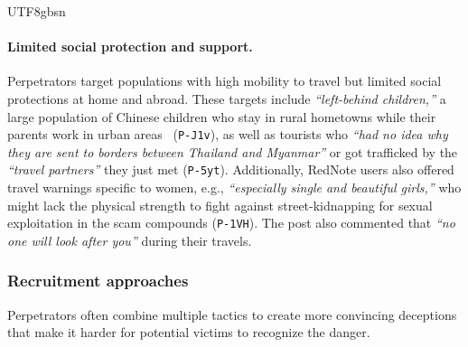 \documentclass[sigconf,nonacm]{acmart}
\begin{document}
\begin{CJK}{UTF8}{gbsn}
\paragraph{\textbf{Limited social protection and support.}} Perpetrators target populations with high mobility to travel but limited social protections at home and abroad. These targets include \textit{``left-behind children,''} a large population of Chinese children who stay in rural hometowns while their parents work in urban areas~\cite{jingzhong2011left} (\texttt{P-J1v}), as well as tourists who \textit{``had no idea why they are sent to borders between Thailand and Myanmar''} or got trafficked by the \textit{``travel partners''} they just met (\texttt{P-5yt}). Additionally, RedNote users also offered travel warnings specific to women, e.g., \textit{``especially single and beautiful girls,''} who might lack the physical strength to fight against street-kidnapping for sexual exploitation in the scam compounds (\texttt{P-1VH}). The post also commented that \textit{``no one will look after you''} during their travels.

\subsubsection{Recruitment approaches}
\label{sec:recruitment_approaches}

Perpetrators often combine multiple tactics to create more convincing deceptions that make it harder for potential victims to recognize the danger.


\end{CJK}
\end{document}
